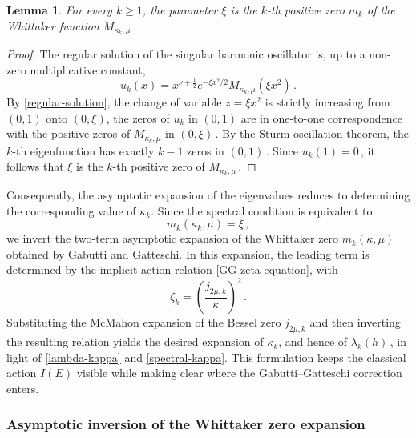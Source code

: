 \documentclass[11pt]{amsart}
\numberwithin{equation}{section}
\newtheorem{lemma}[theorem]{Lemma}
\theoremstyle{remark}
\newcommand{\mn}{\medskip\noindent}
\newcommand{\action}{I}
\begin{document}
\begin{lemma}\label{lemma-index}
For every \(k\ge 1\), the parameter \(\xi\) is the
\(k\)-th positive zero \(m_k\) of the Whittaker function
\(M_{\kappa_k,\mu}\)\,.
\end{lemma}
%
\begin{proof}
The regular solution of the singular harmonic oscillator is, up to a
non-zero multiplicative constant,
\begin{equation}\label{regular-solution-bis}
u_k(x)
=
x^{\nu+\frac12}e^{-\xi x^2/2}
M_{\kappa_k,\mu}(\xi x^2)\,.
\end{equation}
By \eqref{regular-solution}, the change of variable
$
z=\xi x^2
$
is strictly increasing from \((0,1)\) onto \((0,\xi)\), the zeros of
\(u_k\) in \((0,1)\) are in one-to-one correspondence with the positive
zeros of \(M_{\kappa_k,\mu}\) in \((0,\xi)\,\). By the Sturm oscillation
theorem, the \(k\)-th eigenfunction has exactly \(k-1\) zeros in
\((0,1)\,\). Since \(u_k(1)=0\,\), it follows that \(\xi\) is the
\(k\)-th positive zero of \(M_{\kappa_k,\mu}\)\,.
\end{proof}

\mn 
Consequently, the asymptotic expansion of the eigenvalues reduces to
determining the corresponding value of \(\kappa_k\). Since the spectral
condition is equivalent to
\begin{equation}
m_k(\kappa_k,\mu)=\xi\,,
\end{equation}
we invert the two-term asymptotic expansion of the Whittaker zero
\(m_k(\kappa,\mu)\) obtained by Gabutti and Gatteschi. In this expansion,
the leading term is determined by the implicit action relation
\eqref{GG-zeta-equation}, with
\begin{equation}\label{zetak}
\zeta_k=\left(\frac{j_{2\mu,k}}{\kappa}\right)^2\,.
\end{equation}
Substituting the McMahon expansion of the Bessel zero \(j_{2\mu,k}\) and
then inverting the resulting relation yields the desired expansion of
\(\kappa_k\), and hence of \(\lambda_k(h)\,\), in light of \eqref{lambda-kappa} and \eqref{spectral-kappa}. This formulation keeps the
classical action \(\action(E)\) visible while making clear where the
Gabutti--Gatteschi correction enters.




\subsubsection{Asymptotic inversion of the Whittaker zero expansion}\label{sss3.1.4}
\end{document}
